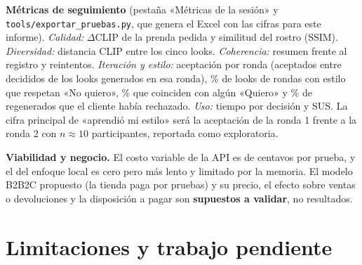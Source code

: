 \documentclass[11pt,letterpaper]{article}
\begin{document}
\textbf{Métricas de seguimiento} (pestaña «Métricas de la sesión» y \texttt{tools/exportar\_pruebas.py}, que genera el
Excel con las cifras para este informe). \emph{Calidad:} $\Delta$CLIP de la prenda pedida y similitud del rostro (SSIM).
\emph{Diversidad:} distancia CLIP entre los cinco looks. \emph{Coherencia:} resumen frente al registro y reintentos.
\emph{Iteración y estilo:} aceptación por ronda (aceptados entre decididos de los looks generados en esa ronda), \% de
looks de rondas con estilo que respetan «No quiero», \% que coinciden con algún «Quiero» y \% de regenerados que el
cliente había rechazado. \emph{Uso:} tiempo por decisión y SUS. La cifra principal de «aprendió mi estilo» será la
aceptación de la ronda 1 frente a la ronda 2 con $n\approx10$ participantes, reportada como exploratoria.

\textbf{Viabilidad y negocio.} El costo variable de la API es de centavos por prueba, y el del enfoque local es cero pero
más lento y limitado por la memoria. El modelo B2B2C propuesto (la tienda paga por pruebas) y su precio, el efecto sobre
ventas o devoluciones y la disposición a pagar son \textbf{supuestos a validar}, no resultados.

\section{Limitaciones y trabajo pendiente}
\label{sec:fin}
\end{document}
